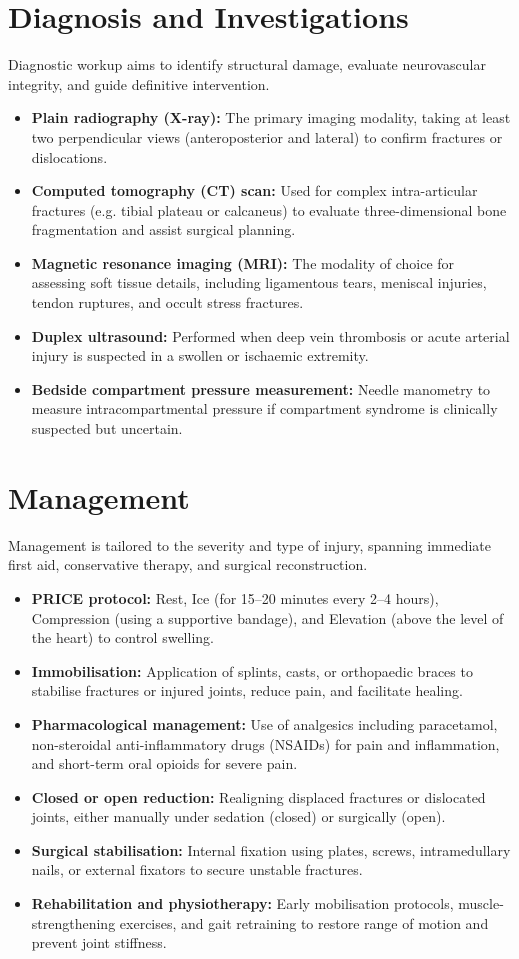 \section*{Diagnosis and Investigations}
Diagnostic workup aims to identify structural damage, evaluate neurovascular integrity, and guide definitive intervention.
\begin{itemize}
    \item \textbf{Plain radiography (X-ray):} The primary imaging modality, taking at least two perpendicular views (anteroposterior and lateral) to confirm fractures or dislocations.
    \item \textbf{Computed tomography (CT) scan:} Used for complex intra-articular fractures (e.g. tibial plateau or calcaneus) to evaluate three-dimensional bone fragmentation and assist surgical planning.
    \item \textbf{Magnetic resonance imaging (MRI):} The modality of choice for assessing soft tissue details, including ligamentous tears, meniscal injuries, tendon ruptures, and occult stress fractures.
    \item \textbf{Duplex ultrasound:} Performed when deep vein thrombosis or acute arterial injury is suspected in a swollen or ischaemic extremity.
    \item \textbf{Bedside compartment pressure measurement:} Needle manometry to measure intracompartmental pressure if compartment syndrome is clinically suspected but uncertain.
\end{itemize}

\section*{Management}
Management is tailored to the severity and type of injury, spanning immediate first aid, conservative therapy, and surgical reconstruction.
\begin{itemize}
    \item \textbf{PRICE protocol:} Rest, Ice (for 15--20 minutes every 2--4 hours), Compression (using a supportive bandage), and Elevation (above the level of the heart) to control swelling.
    \item \textbf{Immobilisation:} Application of splints, casts, or orthopaedic braces to stabilise fractures or injured joints, reduce pain, and facilitate healing.
    \item \textbf{Pharmacological management:} Use of analgesics including paracetamol, non-steroidal anti-inflammatory drugs (NSAIDs) for pain and inflammation, and short-term oral opioids for severe pain.
    \item \textbf{Closed or open reduction:} Realigning displaced fractures or dislocated joints, either manually under sedation (closed) or surgically (open).
    \item \textbf{Surgical stabilisation:} Internal fixation using plates, screws, intramedullary nails, or external fixators to secure unstable fractures.
    \item \textbf{Rehabilitation and physiotherapy:} Early mobilisation protocols, muscle-strengthening exercises, and gait retraining to restore range of motion and prevent joint stiffness.
\end{itemize}

